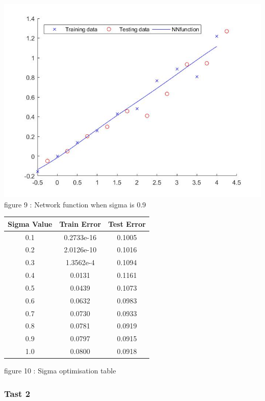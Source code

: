 \documentclass{IEEEtran}[11pt]
\begin{document}
\begin{flushleft}
  \includegraphics[scale = 0.35]{NNfunctiontask1.jpg}
  \vspace{1.5mm}
  {\footnotesize figure 9 : Network function when sigma is 0.9 }
  \\
  \vspace{1.5mm}
\end{flushleft}
\begin{center}
  \begin{tabular}{||c c c||}
    \hline
    Sigma Value & Train Error & Test Error \\ [0.5ex]
    \hline
    0.1 & 0.2733e-16 & 0.1005\\
    0.2 & 2.0126e-10 & 0.1016\\
    0.3 & 1.3562e-4 & 0.1094\\
    0.4 & 0.0131 & 0.1161 \\
    0.5 & 0.0439 & 0.1073 \\
    0.6 & 0.0632 & 0.0983\\
    0.7 & 0.0730 & 0.0933\\
    0.8 & 0.0781 & 0.0919\\
    0.9 & 0.0797 & 0.0915\\
    1.0 & 0.0800 & 0.0918\\
    \hline
  \end{tabular}
\end{center}
\vspace{1.5mm}
{\footnotesize figure 10 : Sigma optimisation table }
\\
\vspace{1.5mm}
\subsubsection{Tast 2}
\end{document}
